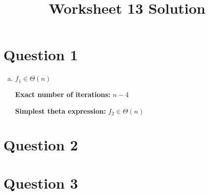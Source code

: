 \documentclass[12pt]{article}
\begin{document}
\title{Worksheet 13 Solution}
\maketitle

\section*{Question 1}
\begin{enumerate}[a.]
    \item

    $f_1 \in \Theta (n)$


    \textbf{Exact number of iterations:} $n-4$

    \textbf{Simplest theta expression:} $f_2 \in \Theta (n)$
\end{enumerate}

\section*{Question 2}

\section*{Question 3}
\end{document}
